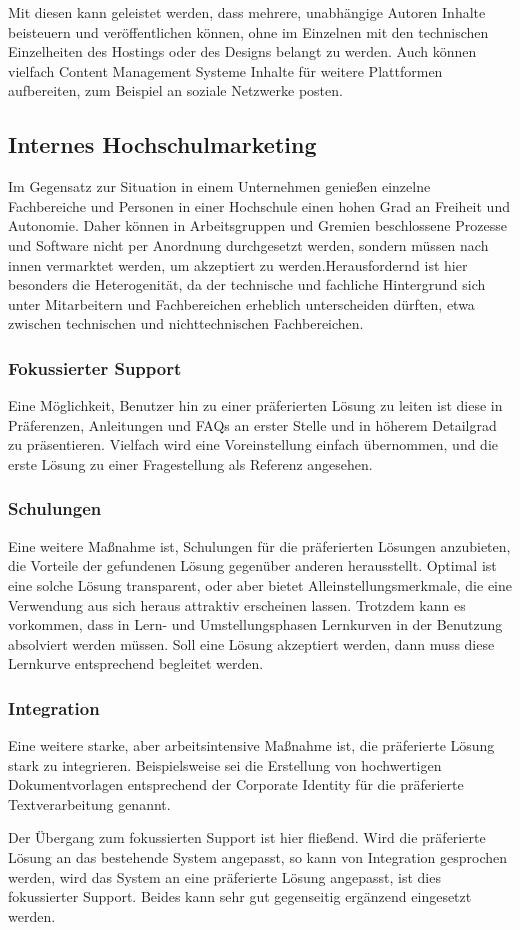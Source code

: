Mit diesen kann geleistet werden, dass mehrere, unabhängige Autoren Inhalte beisteuern und veröffentlichen können, ohne im Einzelnen mit den technischen Einzelheiten des Hostings oder des Designs belangt zu werden. Auch können vielfach Content Management Systeme Inhalte für weitere Plattformen aufbereiten, zum Beispiel an soziale Netzwerke posten.

\subsection{Internes Hochschulmarketing}
\label{subsection_internes_hochschulemarketing}
Im Gegensatz zur Situation in einem Unternehmen genießen einzelne Fachbereiche und Personen in einer Hochschule einen hohen Grad an Freiheit und Autonomie. Daher können in Arbeitsgruppen und Gremien beschlossene Prozesse und Software nicht per Anordnung durchgesetzt werden, sondern müssen nach innen vermarktet werden, um akzeptiert zu werden.Herausfordernd ist hier besonders die Heterogenität, da der technische und fachliche Hintergrund sich unter Mitarbeitern und Fachbereichen erheblich unterscheiden dürften, etwa zwischen technischen und nichttechnischen Fachbereichen.

\subsubsection{Fokussierter Support}
Eine Möglichkeit, Benutzer hin zu einer präferierten Lösung zu leiten ist diese in Präferenzen, Anleitungen und FAQs an erster Stelle und in höherem Detailgrad zu präsentieren. Vielfach wird eine Voreinstellung einfach übernommen, und die erste Lösung zu einer Fragestellung als Referenz angesehen.

\subsubsection{Schulungen}
Eine weitere Maßnahme ist, Schulungen für die präferierten Lösungen anzubieten, die Vorteile der gefundenen Lösung gegenüber anderen herausstellt. Optimal ist eine solche Lösung transparent, oder aber bietet Alleinstellungsmerkmale, die eine Verwendung aus sich heraus attraktiv erscheinen lassen. Trotzdem kann es vorkommen, dass in Lern- und Umstellungsphasen Lernkurven in der Benutzung absolviert werden müssen. Soll eine Lösung akzeptiert werden, dann muss diese Lernkurve entsprechend begleitet werden.

\subsubsection{Integration}
Eine weitere starke, aber arbeitsintensive Maßnahme ist, die präferierte Lösung stark zu integrieren. Beispielsweise sei die Erstellung von hochwertigen Dokumentvorlagen entsprechend der Corporate Identity für die präferierte Textverarbeitung genannt.

Der Übergang zum fokussierten Support ist hier fließend. Wird die präferierte Lösung an das bestehende System angepasst, so kann von Integration gesprochen werden, wird das System an eine präferierte Lösung angepasst, ist dies fokussierter Support. Beides kann sehr gut gegenseitig ergänzend eingesetzt werden.